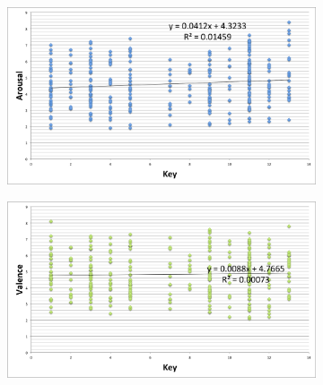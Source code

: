 \begin{figure}
         \centering
        \begin{subfigure}[b]{0.48\textwidth}
                \includegraphics[width=\textwidth]{Figures/key-arousal}
			   \vspace{20pt}
        \end{subfigure}
        \begin{subfigure}[b]{0.48\textwidth}
                \includegraphics[width=\textwidth]{Figures/key-valence}
                  \vspace{20pt}
        \end{subfigure}
        

\end{figure}
